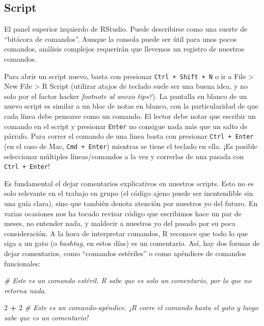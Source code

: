 \documentclass[]{book}
\newenvironment{Shaded}{\begin{snugshade}}{\end{snugshade}}
\newcommand{\DecValTok}[1]{\textcolor[rgb]{0.00,0.00,0.81}{#1}}
\newcommand{\StringTok}[1]{\textcolor[rgb]{0.31,0.60,0.02}{#1}}
\newcommand{\CommentTok}[1]{\textcolor[rgb]{0.56,0.35,0.01}{\textit{#1}}}
\newcommand{\OperatorTok}[1]{\textcolor[rgb]{0.81,0.36,0.00}{\textbf{#1}}}
\begin{document}
\subsection{Script}\label{script}

El panel superior izquierdo de RStudio. Puede describirse como una
suerte de ``bitácora de comandos''. Aunque la consola puede ser útil
para unos pocos comandos, análisis complejos requerirán que llevemos un
registro de nuestros comandos.

Para abrir un script nuevo, basta con presionar
\texttt{Ctrl\ +\ Shift\ +\ N} o ir a File \textgreater{} New File
\textgreater{} R Script (utilizar atajos de teclado suele ser una buena
idea, y no solo por el factor hacker \emph{footnote al anexo tips?}). La
pantalla en blanco de un nuevo script es similar a un bloc de notas en
blanco, con la particularidad de que cada línea debe pensarse como un
comando. El lector debe notar que escribir un comando en el script y
presionar \texttt{Enter} no consigue nada más que un salto de párrafo.
Para correr el comando de una línea basta con presionar
\texttt{Ctrl\ +\ Enter} (en el caso de Mac, \texttt{Cmd\ +\ Enter})
mientras se tiene el teclado en ella. ¡Es posible seleccionar múltiples
líneas/comandos a la vez y correrlas de una pasada con
\texttt{Ctrl\ +\ Enter}!

Es fundamental el dejar comentarios explicativos en nuestros scripts.
Esto no es solo relevante en el trabajo en grupo (el código ajeno puede
ser inentendible sin una guía clara), sino que también denota atención
por nuestros yo del futuro. En varias ocasiones nos ha tocado revisar
código que escribimos hace un par de meses, no entender nada, y maldecir
a nuestros yo del pasado por su poca consideración. A la hora de
interpretar comandos, R reconoce que todo lo que siga a un gato (o
\emph{hashtag}, en estos días) es un comentario. Así, hay dos formas de
dejar comentarios, como ``comandos estériles'' o como apéndices de
comandos funcionales:

\begin{Shaded}
\begin{Highlighting}[]
\CommentTok{# Este es un comando estéril. R sabe que es solo un comentario, por lo que no retorna nada.}
\end{Highlighting}
\end{Shaded}

\begin{Shaded}
\begin{Highlighting}[]
\DecValTok{2} \OperatorTok{+}\StringTok{ }\DecValTok{2} \CommentTok{# Este es un comando-apéndice. ¡R corre el comando hasta el gato y luego sabe que es un comentario!}
\end{Highlighting}
\end{Shaded}
\end{document}
